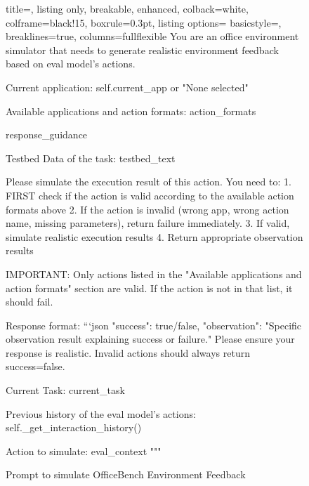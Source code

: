 \begin{figure}[htbp]
    \centering
\begin{tcolorbox}[title=Prompt to simulated OfficeBench Environment Feedback]
\begin{tcblisting}{
  title=,
  listing only,
  breakable,
  enhanced,
  colback=white,
  colframe=black!15,
  boxrule=0.3pt,
  listing options={
    basicstyle=\ttfamily\scriptsize, %
    breaklines=true,
    columns=fullflexible
  }
}
You are an office environment simulator that needs to generate realistic environment feedback based on eval model's actions.

Current application: {self.current_app or "None selected"}

Available applications and action formats:
{action_formats}

{response_guidance}

Testbed Data of the task:
{testbed_text}

Please simulate the execution result of this action. You need to:
1. FIRST check if the action is valid according to the available action formats above
2. If the action is invalid (wrong app, wrong action name, missing parameters), return failure immediately. 
3. If valid, simulate realistic execution results
4. Return appropriate observation results

IMPORTANT: Only actions listed in the "Available applications and action formats" section are valid. If the action is not in that list, it should fail.

Response format:
```json
{{
    "success": true/false,
    "observation": "Specific observation result explaining success or failure."
}}
Please ensure your response is realistic. Invalid actions should always return success=false.

Current Task:
{current_task}

Previous history of the eval model's actions:
{self._get_interaction_history()}

Action to simulate:
{eval_context}
"""
\end{tcblisting}
\end{tcolorbox}
\caption{Prompt to simulate OfficeBench Environment Feedback}
\label{fig:Prompt to simulated OfficeBench Environment Feedback}
\end{figure}


